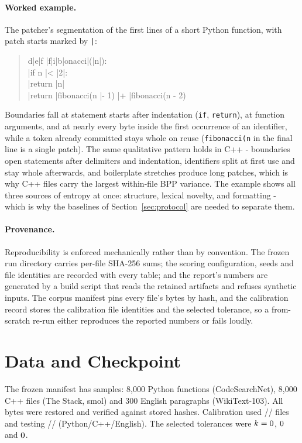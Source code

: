 \paragraph{Worked example.} The patcher's segmentation of the first lines of a short Python function, with patch starts marked by \texttt{|}:

\begin{quote}\small\ttfamily
d|e|f |f|i|b|onacci|(|n|):\\
\quad|if n |< |2|:\\
\quad\quad|return |n|\\
\quad|return |fibonacci(n |- 1) |+ |fibonacci(n - 2)
\end{quote}

Boundaries fall at statement starts after indentation (\texttt{if}, \texttt{return}), at function arguments, and at nearly every byte inside the first occurrence of an identifier, while a token already committed stays whole on reuse (\texttt{fibonacci(n} in the final line is a single patch). The same qualitative pattern holds in C++ - boundaries open statements after delimiters and indentation, identifiers split at first use and stay whole afterwards, and boilerplate stretches produce long patches, which is why C++ files carry the largest within-file BPP variance. The example shows all three sources of entropy at once: structure, lexical novelty, and formatting - which is why the baselines of Section~\ref{sec:protocol} are needed to separate them.

\paragraph{Provenance.} Reproducibility is enforced mechanically rather than by convention. The frozen run directory carries per-file SHA-256 sums; the scoring configuration, seeds and file identities are recorded with every table; and the report's numbers are generated by a build script that reads the retained artifacts and refuses synthetic inputs. The corpus manifest pins every file's bytes by hash, and the calibration record stores the calibration file identities and the selected tolerance, so a from-scratch re-run either reproduces the reported numbers or fails loudly.

\section{Data and Checkpoint}
The frozen manifest has \nSamples{} samples: 8{,}000 Python functions (CodeSearchNet), 8{,}000 C++ files (The Stack, smol) and 300 English paragraphs (WikiText-103). All bytes were restored and verified against stored hashes. Calibration used \nCalPy{}/\nCalCpp{}/\nCalEn{} files and testing \nTestPy{}/\nTestCpp{}/\nTestEn{} (Python/C++/English). The selected tolerances were $k=0$, $0$ and $0$.

